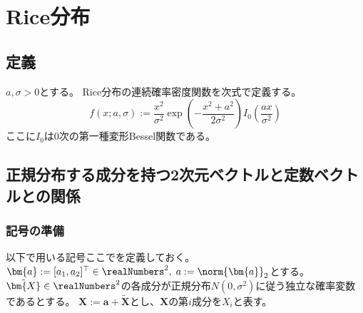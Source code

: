 \chapter{Rice分布}
    \section{定義}
        \begin{shadebox}
            $a, \sigma>0$とする。
            Rice分布の連続確率密度関数を次式で定義する。
            \[ f(x;a,\sigma) := \frac{x^2}{\sigma^2}\exp\left(-\frac{x^2+a^2}{2\sigma^2}\right)I_0\left(\frac{ax}{\sigma^2}\right) \]
            ここに$I_0$は0次の第一種変形Bessel関数である。
        \end{shadebox}
    \section{正規分布する成分を持つ2次元ベクトルと定数ベクトルとの関係}
        \subsection{記号の準備}
            以下で用いる記号ここでを定義しておく。
            $\bm{a} := [a_1,a_2]^\top\in\realNumbers^2,\;a := \norm{\bm{a}}_2$とする。
            $\tilde{\bm{X}}\in\realNumbers^2$の各成分が正規分布$N(0,\sigma^2)$に従う独立な確率変数であるとする。
            $\bm{X} := \bm{a} + \tilde{\bm{X}}$とし、$\bm{X}$の第$i$成分を$X_i$と表す。
